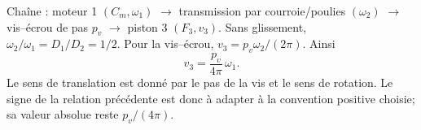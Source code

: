 \begin{corrigebox}
Chaîne : moteur 1 $(C_m,\omega_1)$ $\rightarrow$ transmission par
                courroie/poulies $(\omega_2)$ $\rightarrow$ vis--écrou de pas $p_v$
                $\rightarrow$ piston 3 $(F_3,v_3)$.
Sans glissement, $\omega_2/\omega_1=D_1/D_2=1/2$. Pour la vis--écrou,
                $v_3=p_v\omega_2/(2\pi)$. Ainsi
                \[\boxed{v_3=\frac{p_v}{4\pi}\,\omega_1}.\]
Le sens de translation est donné par le pas de la vis et le sens de
                rotation. Le signe de la relation précédente est donc à adapter à la
                convention positive choisie; sa valeur absolue reste $p_v/(4\pi)$.
\end{corrigebox}
